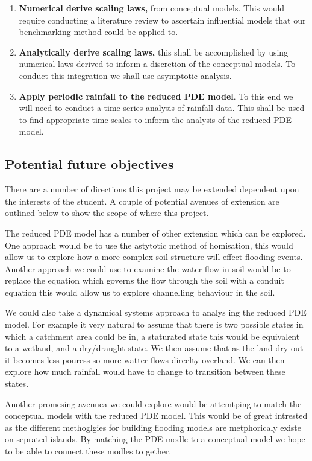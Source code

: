 \documentclass[11pt]{article}
\begin{document}
\begin{enumerate}
    \item \textbf{Numerical derive scaling laws,} from conceptual models. This would require conducting a literature review to ascertain influential models that our benchmarking method could be applied to.
    \item \textbf{Analytically derive scaling laws,} this shall be accomplished by using numerical laws derived to inform a discretion of the conceptual models. To conduct this integration we shall use asymptotic analysis.
    \item \textbf{Apply periodic rainfall to the reduced PDE model}. To this end we will need to conduct a time series analysis of rainfall data. This shall be used to find appropriate time scales to inform the analysis of the reduced PDE model.
\end{enumerate}

\subsection{Potential future objectives}

There are a number of directions this project may be extended dependent upon the interests of the student. A couple of potential avenues of extension are outlined below to show the scope of where this project.

The reduced PDE model has a number of other extension which can be explored. One approach would be to use the astytotic method of homisation, this would allow us to explore how a more complex soil structure will effect flooding events. Another approach we could use to examine the water flow in soil would be to replace the equation which governs the flow through the soil with a conduit equation this would allow us to explore channelling behaviour in the soil.

We could also take a dynamical systems approach to analys ing the reduced PDE model. For example it very natural to assume that there is two possible states in which a catchment area could be in, a staturated state this would be equivalent to a wetland, and a dry/draught state. We then assume that as the land dry out it becomes less pouress so more watter flows direclty overland. We can then explore how much rainfall would have to change to transition between these states.

Another promesing avenuea we could explore would be attemtping to match the conceptual models with the reduced PDE model. This would be of great intrested as the different methoglgies for building flooding models are metphoricaly existe on seprated islands. By matching the PDE modle to a conceptual model we hope to be able to connect these modles to gether.
\end{document}
